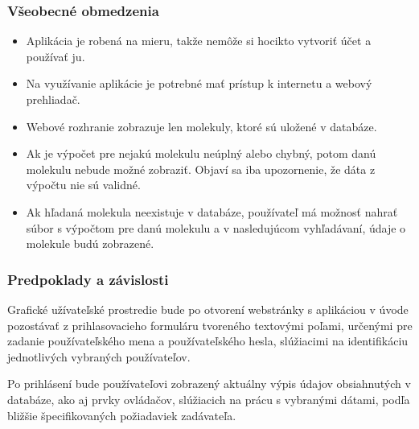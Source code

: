 \documentclass[12pt,a4paper]{article}
\begin{document}
\subsubsection{Všeobecné obmedzenia}
\begin{itemize}
	\item Aplikácia je robená na mieru, takže nemôže si hocikto vytvoriť účet a používať ju.
	\item Na využívanie aplikácie je potrebné mať prístup k internetu a webový prehliadač.
	\item Webové rozhranie zobrazuje len molekuly, ktoré sú uložené v databáze.
	\item Ak je výpočet pre nejakú molekulu neúplný alebo chybný, potom danú molekulu nebude možné zobraziť. Objaví sa iba upozornenie, že dáta z výpočtu nie sú validné.
	\item Ak hľadaná molekula neexistuje v databáze, používateľ má možnosť nahrať súbor s výpočtom pre danú molekulu a v nasledujúcom vyhľadávaní, údaje o molekule budú zobrazené.
\end{itemize}

\subsubsection{Predpoklady a závislosti}
Grafické užívateľské prostredie bude po otvorení webstránky s aplikáciou v úvode pozostávať z prihlasovacieho formuláru tvoreného textovými poľami, určenými pre zadanie používateľského mena a používateľského hesla, slúžiacimi na identifikáciu jednotlivých vybraných používateľov. \par
Po prihlásení bude používateľovi zobrazený aktuálny výpis údajov obsiahnutých v databáze, ako aj prvky ovládačov, slúžiacich na prácu s vybranými dátami, podľa bližšie špecifikovaných požiadaviek zadávateľa.
\end{document}
